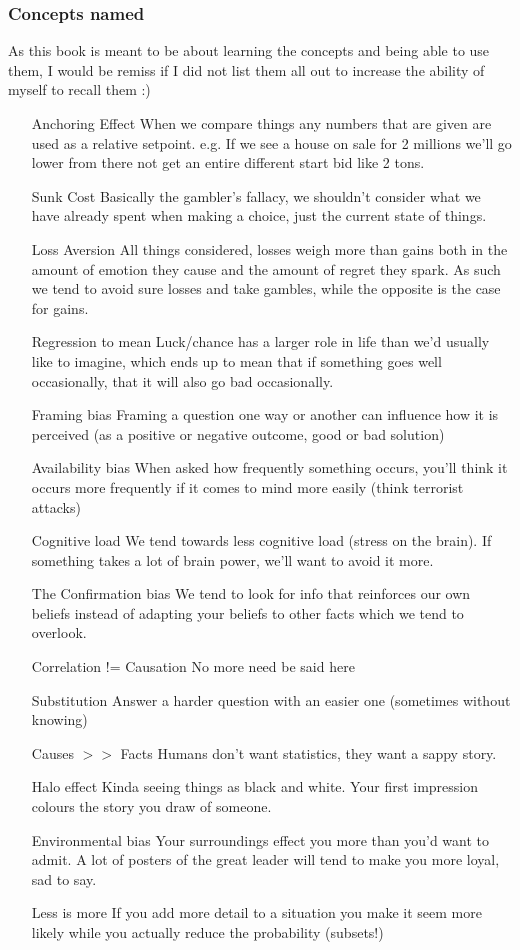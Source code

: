\subsubsection{Concepts named}
As this book is meant to be about learning the concepts and being able to use them, I would be remiss if I did not list them all out to increase the ability of myself to recall them :)

\begin{itemize}[leftmargin=4cm]
\item[Anchoring Effect] When we compare things any numbers that are given are used as a relative setpoint. e.g. If we see a house on sale for 2 millions we'll go lower from there not get an entire different start bid like 2 tons. 
\item[Sunk Cost] Basically the gambler's fallacy, we shouldn't consider what we have already spent when making a choice, just the current state of things.
\item[Loss Aversion] All things considered, losses weigh more than gains both in the amount of emotion they cause and the amount of regret they spark. As such we tend to avoid sure losses and take gambles, while the opposite is the case for gains.
\item[Regression to mean] Luck/chance has a larger role in life than we'd usually like to imagine, which ends up to mean that if something goes well occasionally, that it will also go bad occasionally.
\item[Framing bias] Framing a question one way or another can influence how it is perceived (as a positive or negative outcome, good or bad solution)
\item[Availability bias] When asked how frequently something occurs, you'll think it occurs more frequently if it comes to mind more easily (think terrorist attacks)
\item[Cognitive load] We tend towards less cognitive load (stress on the brain). If something takes a lot of brain power, we'll want to avoid it more.
\item[The Confirmation bias] We tend to look for info that reinforces our own beliefs instead of adapting your beliefs to other facts which we tend to overlook.
\item[Correlation != Causation] No more need be said here
\item[Substitution] Answer a harder question with an easier one (sometimes without knowing)
\item[Causes $>>$ Facts] Humans don't want statistics, they want a sappy story.
\item[Halo effect] Kinda seeing things as black and white. Your first impression colours the story you draw of someone.
\item[Environmental bias] Your surroundings effect you more than you'd want to admit. A lot of posters of the great leader will tend to make you more loyal, sad to say.
\item[Less is more] If you add more detail to a situation you make it seem more likely while you actually reduce the probability (subsets!)

\end{itemize}

